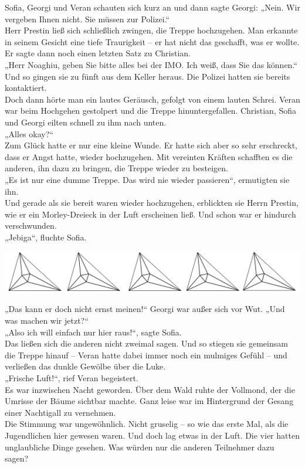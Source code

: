 \documentclass[oneside]{memoir}
\newcommand{\parasep}{
\bigskip
\bigskip
\begin{center} 
   \includegraphics[scale=.08]{parasep5.jpg} 
\end{center}
\bigskip
\bigskip
}
\begin{document}
Sofia, Georgi und Veran schauten sich kurz an und dann sagte Georgi: 
„Nein. Wir vergeben Ihnen nicht. Sie müssen zur Polizei.“ \\
Herr Prestin ließ sich schließlich zwingen, die Treppe hochzugehen. Man erkannte in seinem Gesicht eine tiefe Traurigkeit -- er hat nicht das geschafft, was er wollte. Er sagte dann noch einen letzten Satz zu Christian. \\
„Herr Noaghiu, geben Sie bitte alles bei der IMO. Ich weiß, dass Sie das können.“ \\
Und so gingen sie zu fünft aus dem Keller heraus. Die Polizei hatten sie bereits kontaktiert. \\
Doch dann hörte man ein lautes Geräusch, gefolgt von einem lauten Schrei. Veran war beim Hochgehen gestolpert und die Treppe hinuntergefallen. Christian, Sofia und Georgi eilten schnell zu ihm nach unten. \\
„Alles okay?“ \\
Zum Glück hatte er nur eine kleine Wunde. Er hatte sich aber so sehr erschreckt, dass er Angst hatte, wieder hochzugehen. Mit vereinten Kräften schafften es die anderen, ihn dazu zu bringen, die Treppe wieder zu besteigen. \\
„Es ist nur eine dumme Treppe. Das wird nie wieder passieren“, ermutigten sie ihn. \\
Und gerade als sie bereit waren wieder hochzugehen, erblickten sie Herrn Prestin, wie er ein Morley-Dreieck in der Luft erscheinen ließ. Und schon war er hindurch verschwunden. \\
„Jebiga“, fluchte Sofia.

\parasep
     
\noindent „Das kann er doch nicht ernst meinen!“ Georgi war außer sich vor Wut. „Und was machen wir jetzt?“ \\
„Also ich will einfach nur hier raus!“, sagte Sofia. \\
Das ließen sich die anderen nicht zweimal sagen. Und so stiegen sie gemeinsam die Treppe hinauf -- Veran hatte dabei immer noch ein mulmiges Gefühl -- und verließen das dunkle Gewölbe über die Luke. \\
„Frische Luft!“, rief Veran begeistert. \\
Es war inzwischen Nacht geworden. Über dem Wald ruhte der Vollmond, der die Umrisse der Bäume sichtbar machte. Ganz leise war im Hintergrund der Gesang einer Nachtigall zu vernehmen. \\
Die Stimmung war ungewöhnlich. Nicht gruselig – so wie das erste Mal, als die Jugendlichen hier gewesen waren. Und doch lag etwas in der Luft. Die vier hatten unglaubliche Dinge gesehen. Was würden nur die anderen Teilnehmer dazu sagen?
\end{document}
